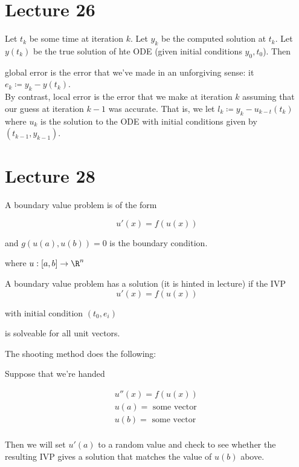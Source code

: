 \documentclass[../main.tex]{subfiles}
\begin{document}
\section{Lecture 26}


\begin{definition}
    Let $t_k$ be some time at iteration $k$. Let $y_k$ be the computed solution at $t_k$. Let $y(t_k)$ be the true solution of hte ODE (given initial conditions $y_0, t_0$). Then

    global error is the error that we've made in an unforgiving sense: it $e_k \coloneq y_k - y(t_k)$. \\

    By contrast, local error is the error that we make at iteration $k$ assuming that our guess at iteration $k-1$ was accurate. That is, we let $l_k \coloneq y_k - u_{k-t}(t_k)$ where $u_k$ is the solution to the ODE with initial conditions given by $(t_{k-1}, y_{k-1})$.
\end{definition}

\section{Lecture 28}


\begin{definition}

    A boundary value problem is of the form

    \[
        u'(x) = f(u(x))
    \]

    and $g(u(a), u(b)) = 0$ is the boundary condition.

    where $u: [a,b] \to \R^n$ 
\end{definition}


\begin{remark}
    A boundary value problem has a solution (it is hinted in lecture) if the IVP
    \[
        u'(x) = f(u(x))
    \]

    with initial condition $(t_0, e_i)$

    is solveable for all unit vectors.
    
\end{remark}

\begin{definition}
    The shooting method does the following:

    Suppose that we're handed 

    \begin{align}
        u''(x) = f(u(x)) \\
        u(a) = \text{ some vector } \\
        u(b) = \text{ some vector } \\
    \end{align}

    Then we will set $u'(a)$ to a random value and check to see whether
    the resulting IVP gives a solution that matches the value of $u(b)$ above.
\end{definition}
\end{document}
